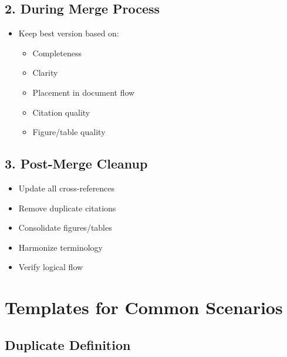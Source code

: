 \documentclass[
  11pt,
  letterpaper,
]{book}
\providecommand{\tightlist}{%
  \setlength{\itemsep}{0pt}\setlength{\parskip}{0pt}}
\begin{document}
\subsection*{2. During Merge Process}\label{during-merge-process}

\begin{itemize}
\tightlist
\item
  Keep best version based on:

  \begin{itemize}
  \tightlist
  \item
    Completeness
  \item
    Clarity
  \item
    Placement in document flow
  \item
    Citation quality
  \item
    Figure/table quality
  \end{itemize}
\end{itemize}

\subsection*{3. Post-Merge Cleanup}\label{post-merge-cleanup}

\begin{itemize}
\tightlist
\item
  Update all cross-references
\item
  Remove duplicate citations
\item
  Consolidate figures/tables
\item
  Harmonize terminology
\item
  Verify logical flow
\end{itemize}

\section*{Templates for Common
Scenarios}\label{templates-for-common-scenarios}


\subsection*{Duplicate Definition}\label{duplicate-definition}
\end{document}
